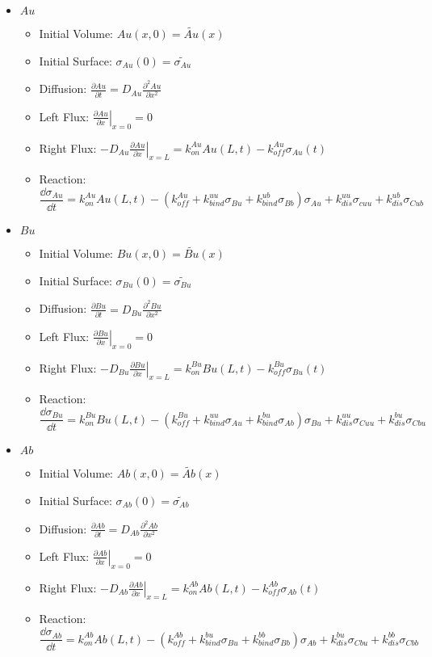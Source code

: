\documentclass[aps, prl, preprint]{revtex4-1}
\begin{document}
\begin{itemize}
\item $Au$
	\begin{itemize}
		\item Initial Volume: $Au(x,0) = \widetilde{Au}(x)$
		\item Initial Surface: $\sigma_{Au}(0) = \widetilde{\sigma_{Au}}$
		\item Diffusion: $\frac{\partial Au}{\partial t} = D_{Au}\frac{\partial^2Au}{\partial x^2}$
		\item Left Flux: $\left . \frac{\partial Au}{\partial x}\right | _{x=0} = 0$
		\item Right Flux: $\left . -D_{Au}\frac{\partial Au}{\partial x}\right |_{x=L} =k_{on}^{Au}Au(L,t) - k_{off}^{Au}\sigma_{Au}(t)$
		\item Reaction: $$\frac{\dd \sigma_{Au}}{\dd t}=k_{on}^{Au}Au(L,t)-(k_{off}^{Au}+k_{bind}^{uu}\sigma_{Bu}+k_{bind}^{ub}\sigma_{Bb})\sigma_{Au}+k_{dis}^{uu}\sigma_{cuu}+k_{dis}^{ub}\sigma_{Cub}$$
	
	\end{itemize}

\item $Bu$
	\begin{itemize}
		\item Initial Volume: $Bu(x,0) = \widetilde{Bu}(x)$
		\item Initial Surface: $\sigma_{Bu}(0) = \widetilde{\sigma_{Bu}}$
		\item Diffusion: $\frac{\partial Bu}{\partial t} = D_{Bu}\frac{\partial^2Bu}{\partial x^2}$
		\item Left Flux: $\left . \frac{\partial Bu}{\partial x}\right | _{x=0} = 0$
		\item Right Flux: $\left . -D_{Bu}\frac{\partial Bu}{\partial x}\right |_{x=L} =k_{on}^{Bu}Bu(L,t) - k_{off}^{Bu}\sigma_{Bu}(t)$
		\item Reaction: $$\frac{\dd \sigma_{Bu}}{\dd t}=k_{on}^{Bu}Bu(L,t)-(k_{off}^{Bu}+k_{bind}^{uu}\sigma_{Au}+k_{bind}^{bu}\sigma_{Ab})\sigma_{Bu}+k_{dis}^{uu}\sigma_{Cuu}+k_{dis}^{bu}\sigma_{Cbu}$$

	\end{itemize}

\item $Ab$
	\begin{itemize}
		\item Initial Volume: $Ab(x,0) = \widetilde{Ab}(x)$
		\item Initial Surface: $\sigma_{Ab}(0) = \widetilde{\sigma_{Ab}}$
		\item Diffusion: $\frac{\partial Ab}{\partial t} = D_{Ab}\frac{\partial^2Ab}{\partial x^2}$
		\item Left Flux: $\left . \frac{\partial Ab}{\partial x}\right | _{x=0} = 0$
		\item Right Flux: $\left . -D_{Ab}\frac{\partial Ab}{\partial x}\right |_{x=L} =k_{on}^{Ab}Ab(L,t) - k_{off}^{Ab}\sigma_{Ab}(t)$
		\item Reaction: $$\frac{\dd \sigma_{Ab}}{\dd t}=k_{on}^{Ab}Ab(L,t)-(k_{off}^{Ab}+k_{bind}^{bu}\sigma_{Bu}+k_{bind}^{bb}\sigma_{Bb})\sigma_{Ab}+k_{dis}^{bu}\sigma_{Cbu}+k_{dis}^{bb}\sigma_{Cbb}$$
	

\end{itemize}
\end{itemize}
\end{document}
